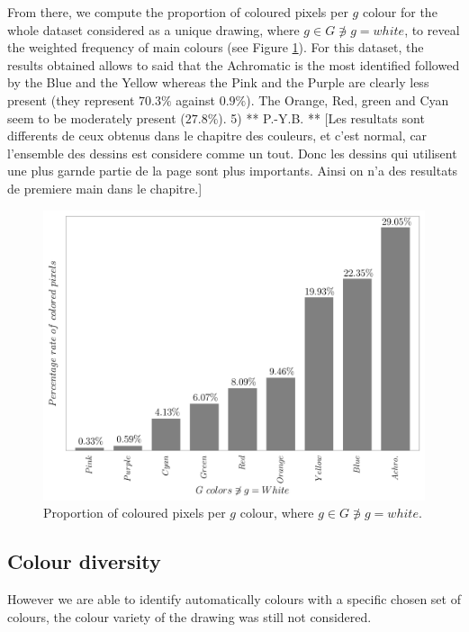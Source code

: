 \documentclass[11pt,a4paper]{article}
\begin{document}
From there, we compute the proportion of coloured pixels per $g$ colour for the whole dataset considered as a unique drawing, where $g \in G \not\ni g = white$, to reveal the weighted frequency of main colours (see Figure \ref{fig:propcolours}). 
For this dataset, the results obtained allows to said that the Achromatic is the most identified followed by the Blue and the Yellow whereas the Pink and the Purple are clearly less present (they represent $70.3\%$ against $0.9\%$). The Orange, Red, green and Cyan seem to be moderately present ($27.8\%$). 
{\color{red} 5) ** P.-Y.B. ** [Les resultats sont differents de ceux obtenus dans le chapitre des couleurs, et c'est normal, car l'ensemble des dessins est considere comme un tout. Donc les dessins qui utilisent une plus garnde partie de la page sont plus importants. Ainsi on n'a des resultats de premiere main dans le chapitre.]}




\begin{figure}[h!]
	\centering
	\includegraphics[width=\linewidth]{figures/colors-barplot.png}
	\caption{Proportion of coloured pixels per $g$ colour, where $g \in G \not\ni g = white$.}
	\label{fig:propcolours}
\end{figure}


\subsection{Colour diversity}
\label{sec:results_diversity}
However we are able to identify automatically colours with a specific chosen set of colours, the colour variety of the drawing was still not considered. 
\end{document}
